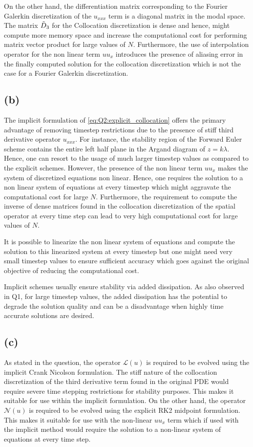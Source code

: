 \documentclass[12pt]{article}
\begin{document}
On the other hand, the differentiation matrix corresponding to the Fourier Galerkin discretization of the $u_{xxx}$ term is a diagonal matrix in the modal space. The matrix $\Tilde{D}_3$ for the Collocation discretization is dense and hence, might compute more memory space and increase the computational cost for performing matrix vector product for large values of $N$. Furthermore, the use of interpolation operator for the non linear term $uu_x$ introduces the presence of aliasing error in the finally computed solution for the collocation discretization which is not the case for a Fourier Galerkin discretization.

\subsection{(b)}
The implicit formulation of \ref{eq:Q2:explicit_collocation} offers the primary advantage of removing timestep restrictions due to the presence of stiff third derivative operator $u_{xxx}$. For instance, the stability region of the Forward Euler scheme contains the entire left half plane in the Argand diagram of $z = k \lambda$. Hence, one can resort to the usage of much larger timestep values as compared to the explicit schemes. However, the presence of the non linear term $uu_x$ makes the system of discretized equations non linear. Hence, one requires the solution to a non linear system of equations at every timestep which might aggravate the computational cost for large $N$. Furthermore, the requirement to compute the inverse of dense matrices found in the collocation discretization of the spatial operator at every time step can lead to very high computational cost for large values of $N$. 

It is possible to linearize the non linear system of equations and compute the solution to this linearized system at every timestep but one might need very small timestep values to ensure sufficient accuracy which goes against the original objective of reducing the computational cost. 

Implicit schemes usually ensure stability via added dissipation. As also observed in Q1, for large timestep values, the added dissipation has the potential to degrade the solution quality and can be a disadvantage when highly time accurate solutions are desired. 
\subsection{(c)}
As stated in the question, the operator $\mathcal{L}(u)$ is required to be evolved using the implicit Crank Nicolson formulation. The stiff nature of the collocation discretization of the third derivative term found in the original PDE would require severe time stepping restrictions for stability purposes. This makes it suitable for use within the implicit formulation. On the other hand, the operator $\mathcal{N}(u)$ is required to be evolved using the explicit RK2 midpoint formulation. This makes it suitable for use with the non-linear $uu_x$ term which if used with the implicit method would require the solution to a non-linear system of equations at every time step. 
\end{document}

